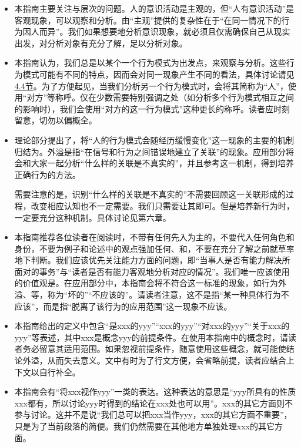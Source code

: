\begin{itemize}
\item 本指南主要关注与层次的问题。人的意识活动是主观的，但“人有意识活动”是客观现象，可以观察和分析。由“主观”提供的复杂性在于“在同一情况下的行为因人而异”。我们如果想要地分析意识现象，就必须且仅需确保自己从现实出发，对分析对象有充分了解，足以分析对象。
\item 本指南认为，我们总是以某个一个行为模式为出发点，来观察与分析。这些行为模式可能有不同的特点，因而会对同一现象产生不同的看法，具体讨论请见\hyperref[sec:解读]{4.4节}。为了方便起见，当我们分析另一个行为模式时，会将其简称为“人”，使用“对方”等称呼。仅在少数需要特别强调之处（如分析多个行为模式相互之间的影响时），我们会使用“对方的这一行为模式”这种更长的称呼。读者应时刻留意，切勿以偏概全。
\item 理论部分提出了，将“人的行为模式会随经历缓慢变化”这一现象的主要的机制归结为。外溢是指“在信号和行为之间错误地建立了关联”的现象。应用部分将会和大家一起分析“什么样的关联是不真实的”，并且参考这一机制，得到培养正确行为的方法。
\begin{explain}
需要注意的是，识别“什么样的关联是不真实的”不需要回顾这一关联形成的过程，改变相应认知也不一定需要。我们只需要让其即可。但是培养新行为时，一定要充分\hyperref[def:理解行为]{}这种机制。具体讨论见第六章。
\end{explain}
\item 本指南推荐各位读者在阅读时，不带有任何先入为主的，不要代入任何角色和身份，不要为例子和论述中的观点强加任何、和，不要在充分了解之前就草率地下判断。我们应该优先关注能力方面的问题，即“当事人是否有能力解决所面对的事务”与“读者是否有能力客观地分析对应的情况”。我们唯一应该使用的价值观是。在应用部分中，本指南会将不符合这一标准的现象，如行为外溢、等，称为“坏的”“不应该的”。请读者注意，这不是指“某一种具体行为不应该”，而是指“脱离了该行为的应用范围”这一现象不应该。
\item 本指南给出的定义中包含“是xxx的yyy”“xxx的yyy”“对xxx的yyy”“关于xxx的yyy”等表述，其中xxx是概念yyy的前提条件。在使用本指南中的概念时，请读者务必留意其适用范围。如果忽视前提条件，随意使用这些概念，就可能使结论外溢，从而失去意义。文中有时为了行文方便，会省略前提，读者应结合上下文以自行补全。
\item 本指南会有“将xxx视作yyy”一类的表达。这种表达的意思是“yyy所具有的性质xxx都有，所以讨论yyy时得到的结论在xxx处也可以用”。xxx的其它方面则不参与讨论。这并不是说“我们总可以把xxx当作yyy，xxx的其它方面不重要”，只是为了当前段落的简便。我们仍然需要在其他地方单独处理xxx的其它方面。

\end{itemize}
